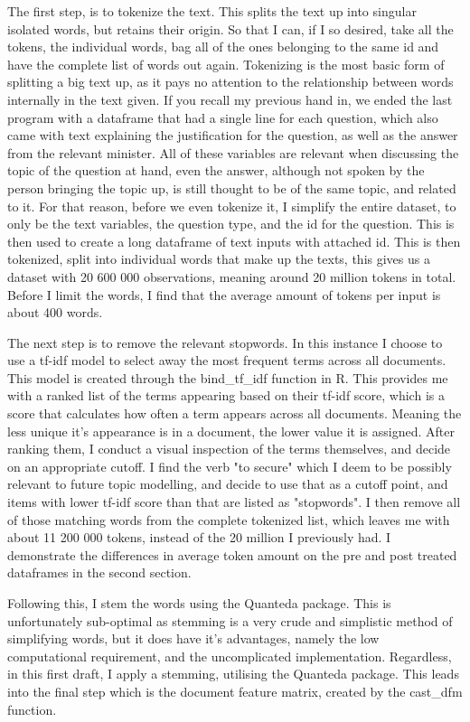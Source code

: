 \documentclass[12pt]{article}
\begin{document}
	The first step, is to tokenize the text. This splits the text up into singular isolated words, but retains their origin. So that I can, if I so desired, take all the tokens, the individual words, bag all of the ones belonging to the same id and have the complete list of words out again. Tokenizing is the most basic form of splitting a big text up, as it pays no attention to the relationship between words internally in the text given. If you recall my previous hand in, we ended the last program with a dataframe that had a single line for each question, which also came with text explaining the justification for the question, as well as the answer from the relevant minister. All of these variables are relevant when discussing the topic of the question at hand, even the answer, although not spoken by the person bringing the topic up, is still thought to be of the same topic, and related to it. For that reason, before we even tokenize it, I simplify the entire dataset, to only be the text variables, the question type, and the id for the question. This is then used to create a long dataframe of text inputs with attached id. This is then tokenized, split into individual words that make up the texts, this gives us a dataset with 20 600 000 observations, meaning around 20 million tokens in total. Before I limit the words, I find that the average amount of tokens per input is about 400 words. 
	
	The next step is to remove the relevant stopwords. In this instance I choose to use a tf-idf model to select away the most frequent terms across all documents. This model is created through the bind\_tf\_idf function in R. This provides me with a ranked list of the terms appearing based on their tf-idf score, which is a score that calculates how often a term appears across all documents. Meaning the less unique it's appearance is in a document, the lower value it is assigned. After ranking them, I conduct a visual inspection of the terms themselves, and decide on an appropriate cutoff. I find the verb "to secure" which I deem to be possibly relevant to future topic modelling, and decide to use that as a cutoff point, and items with lower tf-idf score than that are listed as "stopwords". I then remove all of those matching words from the complete tokenized list, which leaves me with about 11 200 000 tokens, instead of the 20 million I previously had. I demonstrate the differences in average token amount on the pre and post treated dataframes in the second section. 
	
	Following this, I stem the words using the Quanteda package. This is unfortunately sub-optimal as stemming is a very crude and simplistic method of simplifying words, but it does have it's advantages, namely the low computational requirement, and the uncomplicated implementation. Regardless, in this first draft, I apply a stemming, utilising the Quanteda package. This leads into the final step which is the document feature matrix, created by the cast\_dfm function. 
	
\end{document}
